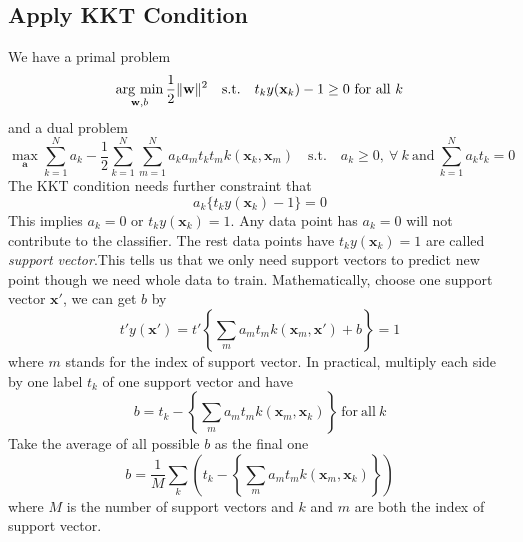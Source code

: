 \documentclass[../main.tex]{subfiles}
\begin{document}
        \subsection{Apply KKT Condition}
            We have a primal problem
            \[
                \operatorname*{arg~min}_{\mathbf{w},b} \frac{1}{2} \|\mathbf{w}\|^2 \mathrm{\quad s.t. \quad} t_k y(\mathbf{x}_k) -1 \geq 0 \mathrm{~for~all~}k
            \]
            and a dual problem
            \[
                \max_{\mathbf{a}}\sum_{k=1}^N a_k - \frac{1}{2} \sum_{k=1}^N \sum_{m=1}^N a_k a_m t_k t_m k(\mathbf{x}_k, \mathbf{x}_m) \mathrm{\quad s.t. \quad} a_k \geq 0,~\forall~k\mathrm{~and~}\sum_{k=1}^N a_k t_k = 0
            \]
            The KKT condition needs further constraint that
            \[
                a_k \{t_k y(\mathbf{x}_k) - 1\} = 0
            \]
            This implies $a_k=0$ or $t_k y(\mathbf{x}_k)=1$. Any data point has $a_k=0$ will not contribute to the classifier. The rest data points have $t_k y(\mathbf{x}_k)=1$ are called \textit{support vector}.This tells us that we only need support vectors to predict new point though we need whole data to train. Mathematically, choose one support vector $\mathbf{x}'$, we can get $b$ by
            \[
                t' y(\mathbf{x}') = t'\left\{ \sum_{m} a_m t_m k(\mathbf{x}_m, \mathbf{x}') + b \right\} = 1
            \]
            where $m$ stands for the index of support vector. In practical, multiply each side by one label $t_k$ of one  support vector and have
            \[
                b = t_k - \left\{ \sum_m a_m t_m k(\mathbf{x}_m, \mathbf{x}_k) \right\} \mathrm{~for~all~}k
            \]
            Take the average of all possible $b$ as the final one
            \[
                b = \frac{1}{M} \sum_{k}\left(t_k - \left\{ \sum_m a_m t_m k(\mathbf{x}_m, \mathbf{x}_k) \right\}\right)
            \]
            where $M$ is the number of support vectors and $k$ and $m$ are both the index of support vector.
\end{document}
